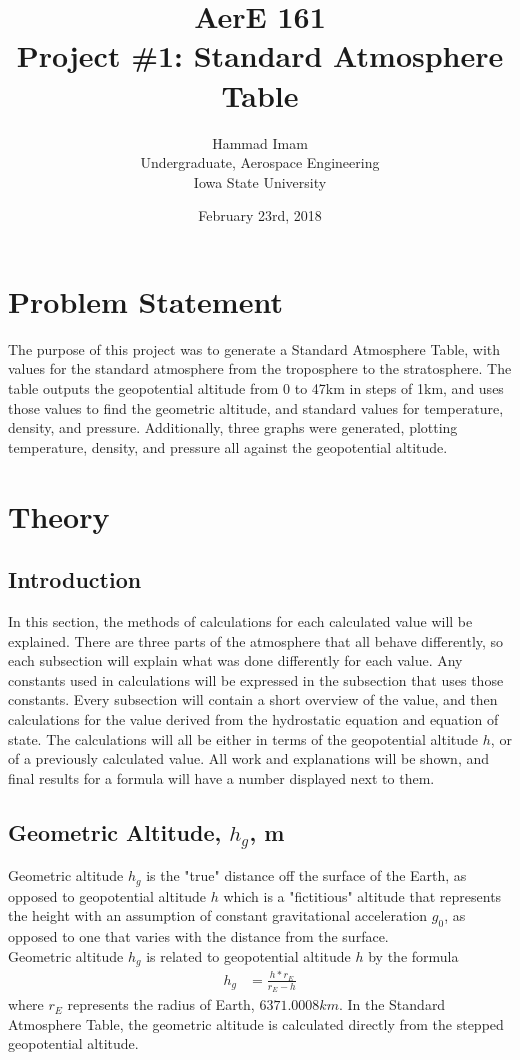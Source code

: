 \documentclass{article}
\title{AerE 161 \\ Project \#1: Standard Atmosphere Table}
\author{Hammad Imam \\ Undergraduate, Aerospace Engineering \\ Iowa State University}
\date{February 23rd, 2018}
\begin{document}
\begin{titlepage}
\maketitle
\end{titlepage}

\clearpage
\tableofcontents

\section{Problem Statement}
The purpose of this project was to generate a Standard Atmosphere Table, with values for the standard atmosphere from the troposphere to the stratosphere. The table outputs the geopotential altitude from 0 to 47km in steps of 1km, and uses those values to find the geometric altitude, and standard values for temperature, density, and pressure. Additionally, three graphs were generated, plotting temperature, density, and pressure all against the geopotential altitude. 

\section{Theory}
\subsection{Introduction}
In this section, the methods of calculations for each calculated value will be explained. There are three parts of the atmosphere that all behave differently, so each subsection will explain what was done differently for each value. Any constants used in calculations will be expressed in the subsection that uses those constants. Every subsection will contain a short overview of the value, and then calculations for the value derived from the hydrostatic equation and equation of state. The calculations will all be either in terms of the geopotential altitude $h$, or of a previously calculated value. All work and explanations will be shown, and final results for a formula will have a number displayed next to them.

\subsection{Geometric Altitude, \texorpdfstring{$h_g$}{}, m}
Geometric altitude $h_g$ is the "true" distance off the surface of the Earth, as opposed to geopotential altitude $h$ which is a "fictitious" altitude that represents the height with an assumption of constant gravitational acceleration $g_0$, as opposed to one that varies with the distance from the surface.\\
Geometric altitude $h_g$ is related to geopotential altitude $h$ by the formula 
\begin{align}
    h_g &= \frac{h * r_E}{r_E - h}
\end{align}
where $r_E$ represents the radius of Earth, $6371.0008 km$. In the Standard Atmosphere Table, the geometric altitude is calculated directly from the stepped geopotential altitude.
\end{document}
